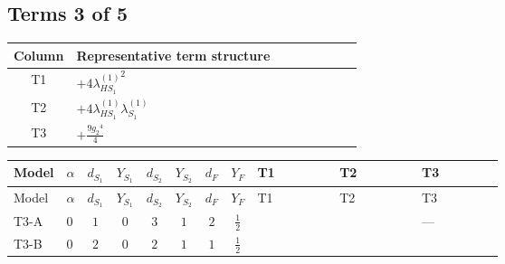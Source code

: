 \documentclass[8pt]{article}
\begin{document}
\begin{landscape}
\subsection*{Terms 3 of 5}
\begin{center}
\begin{tabular}{@{}c >{\raggedright\arraybackslash}p{0.82\linewidth}@{}}
\toprule
Column & Representative term structure \\
\midrule
T1 & \(\displaystyle +4 {\lambda_{HS_1}^{(1)}}^2\) \\
\midrule
T2 & \(\displaystyle +4 {\lambda_{HS_1}^{(1)}} {\lambda_{S_1}^{(1)}}\) \\
\midrule
T3 & \(\displaystyle +\frac{9 {g_2}^4}{4}\) \\
\midrule
\bottomrule
\end{tabular}
\end{center}
\smallskip
\tiny
\begin{longtable}{@{}llcccccc >{\raggedright\arraybackslash}p{0.21\linewidth} >{\raggedright\arraybackslash}p{0.21\linewidth} >{\raggedright\arraybackslash}p{0.21\linewidth}@{}}
\toprule
Model & $\alpha$ & $d_{S_1}$ & $Y_{S_1}$ & $d_{S_2}$ & $Y_{S_2}$ & $d_F$ & $Y_F$ & T1 & T2 & T3 \\
\midrule
\endfirsthead
\toprule
Model & $\alpha$ & $d_{S_1}$ & $Y_{S_1}$ & $d_{S_2}$ & $Y_{S_2}$ & $d_F$ & $Y_F$ & T1 & T2 & T3 \\
\midrule
\endhead
T3-A & $0$ & $1$ & $0$ & $3$ & $1$ & $2$ & $\frac{1}{2}$ & \scriptsize\adjustbox{max width=\linewidth}{$\begin{gathered} +4 {\lambda_{HS_1}^{(1)}}^2\end{gathered}$} & \scriptsize\adjustbox{max width=\linewidth}{$\begin{gathered} +4 {\lambda_{HS_1}^{(1)}} {\lambda_{S_1}^{(1)}}\end{gathered}$} & --- \\
\midrule
T3-B & $0$ & $2$ & $0$ & $2$ & $1$ & $1$ & $\frac{1}{2}$ & \scriptsize\adjustbox{max width=\linewidth}{$\begin{gathered} +4 {\lambda_{HS_1}^{(1)}}^2\end{gathered}$} & \scriptsize\adjustbox{max width=\linewidth}{$\begin{gathered} +6 {\lambda_{HS_1}^{(1)}} {\lambda_{S_1}^{(1)}}\end{gathered}$} & \scriptsize\adjustbox{max width=\linewidth}{$\begin{gathered} +\frac{9 {g_2}^4}{4}\end{gathered}$} \\

\end{longtable}
\end{landscape}
\end{document}
